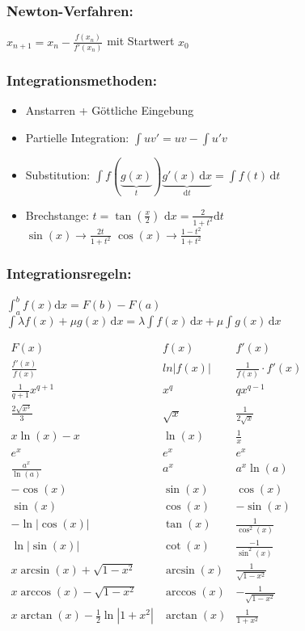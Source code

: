\documentclass[6pt,a4paper]{scrartcl}
\begin{document}
\begin{multicols}{4}
\subsubsection{Newton-Verfahren:}
$x_{n+1}=x_n-\frac{f(x_n)}{f'(x_n)}$ mit Startwert $x_0$

\subsubsection{Integrationsmethoden:}
\begin{itemize}\itemsep0pt
\item Anstarren + Göttliche Eingebung
\item Partielle Integration: $\int uv'=uv-\int u'v$
\item Substitution: $\int f(\underbrace {g(x)}_{t}) \underbrace {g'(x)\,\mathrm dx}_{\mathrm dt}=\int f(t)\, \mathrm dt$
\item Brechstange: $t=\tan(\frac{x}{2})$ \quad $\mathrm dx = \frac{2}{1+t^2} \mathrm dt$ \\ $\sin(x) \rightarrow \frac{2t}{1+t^2}$ \qquad $\cos(x) \rightarrow \frac{1-t^2}{1+t^2}$
\end{itemize}

\subsubsection{Integrationsregeln:}
$\int_a^b f(x) \mathrm dx = F(b) - F(a)$\\
$\int\lambda f(x)+\mu g(x) \, \mathrm dx=\lambda\int f(x) \, \mathrm dx + \mu\int g(x) \, \mathrm dx$

\everymath{\displaystyle}	%
\begin{math}\renewcommand{\arraystretch}{1.8}
\begin{array}{c|c|c}
F(x) & f(x) & f'(x) \\ \hline 
\frac{f'(x)}{f(x)}&ln|f(x)|&\frac{1}{f(x)}\cdot f'(x)\\
\frac{1}{q+1}x^{q+1} & x^q & qx^{q-1} \\
\frac{2\sqrt{x^3}}{3} & \sqrt{x} & \frac{1}{2\sqrt{x}}\\
x\ln(x) -x & \ln(x) & \textstyle \frac{1}{x}\\
e^x & e^x & e^x \\
\frac{a^x}{\ln(a)} & a^x & a^x \ln(a) \\
-\cos(x) & \sin(x) & \cos(x)\\
\sin(x) & \cos(x) & -\sin(x)\\
-\ln |\cos(x)| & \tan(x) & \frac{1}{\cos^2(x)} \\
\ln |\sin(x)| & \cot(x) & \frac{-1}{\sin^2(x)} \\
x\arcsin (x)+\sqrt{1-x^2} & \arcsin(x) & \frac{1}{\sqrt{1-x^2}}\\
x\arccos (x)-\sqrt{1-x^2} & \arccos(x) & -\frac{1}{\sqrt{1-x^2}}\\
x\arctan (x)-\frac{1}{2} \ln \left| 1+ x^2 \right| & \arctan (x) & \frac{1}{1+x^2} \\
\end{array}
\end{math}
\everymath{\textstyle}



\end{multicols}
\end{document}
